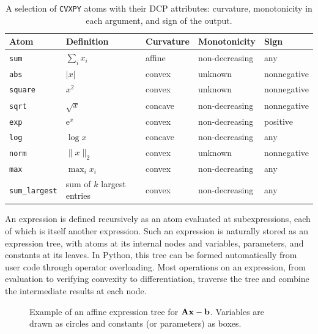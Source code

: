 \begin{table}[htbp]
\centering
\caption{A selection of \texttt{CVXPY} atoms with their DCP attributes: curvature, monotonicity in
each argument, and sign of the output.}
\label{tab:atoms}
\begin{tabular}{l l l l l}
\toprule
Atom & Definition & Curvature & Monotonicity & Sign \\
\midrule
\texttt{sum}          & $\textstyle\sum_i x_i$        & affine  & non-decreasing & any \\
\texttt{abs}          & $|x|$                         & convex  & unknown & nonnegative \\
\texttt{square}       & $x^2$                         & convex  & unknown & nonnegative \\
\texttt{sqrt}         & $\sqrt{x}$                    & concave & non-decreasing & nonnegative \\
\texttt{exp}          & $\mathrm{e}^x$                & convex  & non-decreasing & positive \\
\texttt{log}          & $\log x$                      & concave & non-decreasing & any \\
\texttt{norm}         & $\|x\|_2$                     & convex  & unknown & nonnegative \\
\texttt{max}          & $\max_i x_i$                  & convex  & non-decreasing & any \\
\texttt{sum\_largest} & sum of $k$ largest entries    & convex  & non-decreasing & any \\
\bottomrule
\end{tabular}
\end{table}

An expression is defined recursively as an atom evaluated at subexpressions, each of which is
itself another expression. Such an expression is naturally stored as an expression tree,
with atoms at its internal nodes and variables, parameters, and constants at its leaves.
In Python, this tree can be formed automatically from user code through operator overloading.
Most operations on an expression, from evaluation to verifying convexity to
differentiation, traverse the tree and combine the intermediate results at each node.
\begin{figure}[htbp]
\centering
{}
\caption{Example of an affine expression tree for $\mathbf{A}\mathbf{x} - \mathbf{b}$. Variables are
drawn as circles and constants (or parameters) as boxes.}
\label{fig:expr-tree}
\end{figure}

